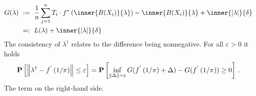  \begin{align*}
   G(\lambda)
   &
   \ 
   :=
   \ 
      \frac{1}{n}
      \sum_{j = 1}^{n} 
        T_i
        \cdot
        f^* 
        \left( 
          \inner
          {B(X_i)}
          {\lambda}
        \right)
      -
          \inner
          {B(X_i)}
          {\lambda}
      +
      \inner
      { | \lambda | }
      { \delta }
      \\
   &
   \ 
   =:
   \ 
      L( \lambda )
      +
      \inner
      { | \lambda | }
      { \delta }
 \end{align*} 
 The consistency of 
 $
  \lambda ^ \dagger
 $
 relates to the difference being nonnegative.
 For all 
 $
  \varepsilon > 0
 $
 it holds
 \begin{gather*}
   \mathbf{P}
   \left[ 
     \left\lVert
      \lambda ^ \dagger
      -
      f ^ { ' }
      \left( 
        1 / \pi 
      \right)
     \right\rVert
     \le
     \varepsilon
   \right]
   =
   \mathbf{P}
   \left[ 
     \inf _ { \left\lVert\Delta\right\rVert = \varepsilon }
     G
     (
      f ^ { ' }
      \left( 
        1 / \pi 
      \right)
      +
      \Delta
     )
     -
     G
     (
      f ^ { ' }
      \left( 
        1 / \pi 
      \right)
     )
     \ge 
     0
   \right]
   \,.
 \end{gather*}
 The term on the right-hand side.
